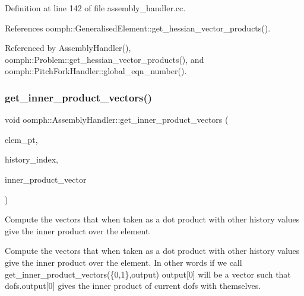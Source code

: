 Definition at line 142 of file assembly\+\_\+handler.\+cc.



References oomph\+::\+Generalised\+Element\+::get\+\_\+hessian\+\_\+vector\+\_\+products().



Referenced by Assembly\+Handler(), oomph\+::\+Problem\+::get\+\_\+hessian\+\_\+vector\+\_\+products(), and oomph\+::\+Pitch\+Fork\+Handler\+::global\+\_\+eqn\+\_\+number().

\mbox{\label{classoomph_1_1AssemblyHandler_a2300910f43476551318d74e3a90e7713}} 
\subsubsection{\texorpdfstring{get\+\_\+inner\+\_\+product\+\_\+vectors()}{get\_inner\_product\_vectors()}}
{\footnotesize\ttfamily void oomph\+::\+Assembly\+Handler\+::get\+\_\+inner\+\_\+product\+\_\+vectors (\begin{DoxyParamCaption}\item[{\hyperlink{classoomph_1_1GeneralisedElement}{Generalised\+Element} $\ast$const \&}]{elem\+\_\+pt,  }\item[{\hyperlink{classoomph_1_1Vector}{Vector}$<$ unsigned $>$ const \&}]{history\+\_\+index,  }\item[{\hyperlink{classoomph_1_1Vector}{Vector}$<$ \hyperlink{classoomph_1_1Vector}{Vector}$<$ double $>$ $>$ \&}]{inner\+\_\+product\+\_\+vector }\end{DoxyParamCaption})\hspace{0.3cm}{\ttfamily [virtual]}}



Compute the vectors that when taken as a dot product with other history values give the inner product over the element. 

Compute the vectors that when taken as a dot product with other history values give the inner product over the element. In other words if we call get\+\_\+inner\+\_\+product\+\_\+vectors(\{0,1\},output) output\mbox{[}0\mbox{]} will be a vector such that dofs.\+output\mbox{[}0\mbox{]} gives the inner product of current dofs with themselves. 

